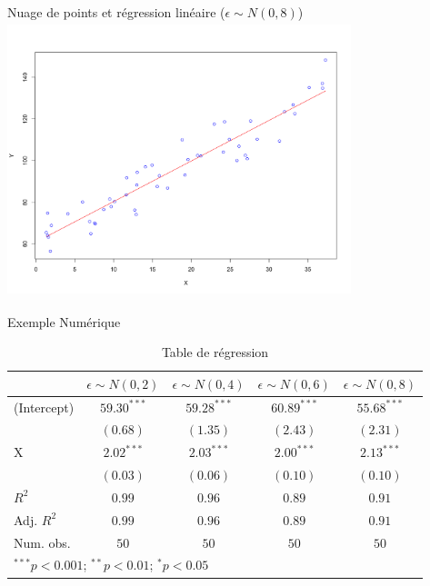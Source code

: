 \documentclass{beamer}
\begin{document}
\begin{frame}{Nuage de points et régression linéaire (\( \epsilon \sim N(0,8) \))}
  \includegraphics[width=10cm, height=8cm]{ols_8.png}
\end{frame}

\begin{frame}{Exemple Numérique}
\begin{table}
\begin{center}
\begin{tabular}{l c c c c}
\hline
 & \( \epsilon \sim N(0,2) \) & \( \epsilon \sim N(0,4) \) & \( \epsilon \sim N(0,6) \) & \( \epsilon \sim N(0,8) \) \\
\hline
(Intercept) & \( 59.30^{***} \) & \( 59.28^{***} \) & \( 60.89^{***} \) & \( 55.68^{***} \) \\
            & \( (0.68) \)      & \( (1.35) \)      & \( (2.43) \)      & \( (2.31) \)      \\
X           & \( 2.02^{***} \)  & \( 2.03^{***} \)  & \( 2.00^{***} \)  & \( 2.13^{***} \)  \\
            & \( (0.03) \)      & \( (0.06) \)      & \( (0.10) \)      & \( (0.10) \)      \\
\hline
\( R^2 \)       & \( 0.99 \)        & \( 0.96 \)        & \( 0.89 \)        & \( 0.91 \)        \\
Adj. \( R^2 \)  & \( 0.99 \)        & \( 0.96 \)        & \( 0.89 \)        & \( 0.91 \)        \\
Num. obs.       & \( 50 \)          & \( 50 \)          & \( 50 \)          & \( 50 \)          \\
\hline
\multicolumn{5}{l}{\scriptsize{\(^{***}p<0.001\); \(^{**}p<0.01\); \(^{*}p<0.05\)}}
\end{tabular}
\caption{Table de régression}
\label{table:coefficients}
\end{center}
\end{table}
\end{frame}
\end{document}
